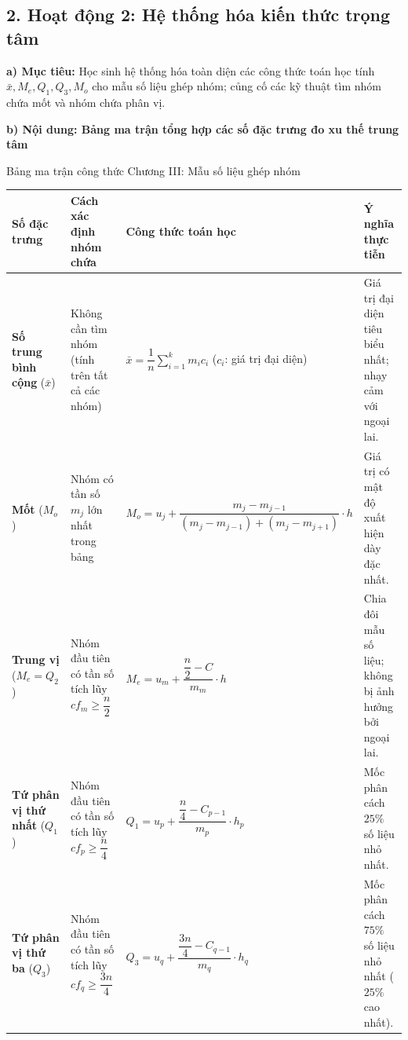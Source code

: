 \documentclass[12pt, a4paper]{article}
\begin{document}
\subsection*{2. Hoạt động 2: Hệ thống hóa kiến thức trọng tâm}

\noindent \textbf{a) Mục tiêu:}
Học sinh hệ thống hóa toàn diện các công thức toán học tính $\bar{x}, M_e, Q_1, Q_3, M_o$ cho mẫu số liệu ghép nhóm; củng cố các kỹ thuật tìm nhóm chứa mốt và nhóm chứa phân vị.

\noindent \textbf{b) Nội dung: Bảng ma trận tổng hợp các số đặc trưng đo xu thế trung tâm}
\begin{pedabox}{Bảng ma trận công thức Chương III: Mẫu số liệu ghép nhóm}
\begin{center}
\small
\begin{tabularx}{\textwidth}{|p{2.8cm}|p{3.8cm}|X|X|}
\hline
\textbf{Số đặc trưng} & \textbf{Cách xác định nhóm chứa} & \textbf{Công thức toán học} & \textbf{Ý nghĩa thực tiễn} \\ \hline
\textbf{Số trung bình cộng} ($\bar{x}$) & Không cần tìm nhóm (tính trên tất cả các nhóm) & $\bar{x} = \dfrac{1}{n} \sum_{i=1}^k m_i c_i$ \newline ($c_i$: giá trị đại diện) & Giá trị đại diện tiêu biểu nhất; nhạy cảm với ngoại lai. \\ \hline
\textbf{Mốt} ($M_o$) & Nhóm có tần số $m_j$ lớn nhất trong bảng & $M_o = u_j + \dfrac{m_j - m_{j-1}}{(m_j - m_{j-1}) + (m_j - m_{j+1})} \cdot h$ & Giá trị có mật độ xuất hiện dày đặc nhất. \\ \hline
\textbf{Trung vị} ($M_e = Q_2$) & Nhóm đầu tiên có tần số tích lũy $cf_m \ge \dfrac{n}{2}$ & $M_e = u_m + \dfrac{\dfrac{n}{2} - C}{m_m} \cdot h$ & Chia đôi mẫu số liệu; không bị ảnh hưởng bởi ngoại lai. \\ \hline
\textbf{Tứ phân vị thứ nhất} ($Q_1$) & Nhóm đầu tiên có tần số tích lũy $cf_p \ge \dfrac{n}{4}$ & $Q_1 = u_p + \dfrac{\dfrac{n}{4} - C_{p-1}}{m_p} \cdot h_p$ & Mốc phân cách $25\%$ số liệu nhỏ nhất. \\ \hline
\textbf{Tứ phân vị thứ ba} ($Q_3$) & Nhóm đầu tiên có tần số tích lũy $cf_q \ge \dfrac{3n}{4}$ & $Q_3 = u_q + \dfrac{\dfrac{3n}{4} - C_{q-1}}{m_q} \cdot h_q$ & Mốc phân cách $75\%$ số liệu nhỏ nhất ($25\%$ cao nhất). \\ \hline
\end{tabularx}
\end{center}
\end{pedabox}
\end{document}
